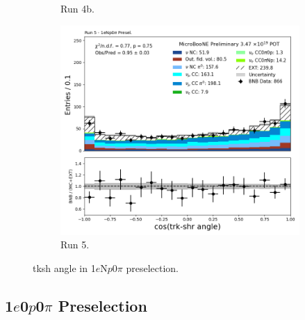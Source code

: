 \begin{figure}[H]
\begin{subfigure}[t]{0.32\linewidth}
        \caption{Run 4b.}
    \end{subfigure}%
    \hspace{0.2cm}%
    \begin{subfigure}[t]{0.32\linewidth}
        \includegraphics[width=\linewidth]{technote/Appendix_Preselection/Figures/1eNp0pi/Run5/tksh_angle_Run5_1eNp0pi_Presel.png}
        \caption{Run 5.}
    \end{subfigure}
    \caption{tksh angle in 1$e$N$p$0$\pi$ preselection.}
\end{figure}

\subsection{1$e$0$p$0$\pi$ Preselection}
\label{appendix:0p0pi_preselection}


